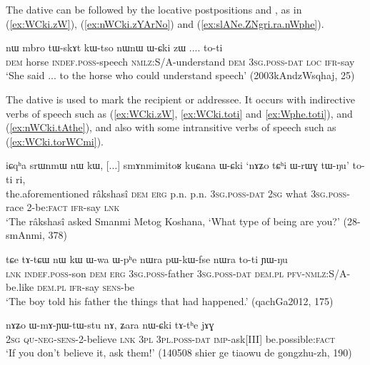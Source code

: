 The dative can be followed by the locative postpositions  and , as in (\ref{ex:WCki.zW}), (\ref{ex:nWCki.zYArNo}) and (\ref{ex:slANe.ZNgri.ra.nWphe}).


\begin{exe}
\ex \label{ex:WCki.zW}
\gll nɯ mbro tɯ-skɤt kɯ-tso nɯnɯ ɯ-ɕki zɯ .... to-ti \\
\textsc{dem} horse \textsc{indef}.\textsc{poss}-speech \textsc{nmlz}:S/A-understand \textsc{dem} \textsc{3sg}.\textsc{poss}-\textsc{dat} \textsc{loc} { } \textsc{ifr}-say \\
\glt `She said ... to the horse who could understand speech' (2003kAndzWsqhaj, 25)
\end{exe}

The dative is used to mark the recipient or addressee. It occurs with indirective verbs of speech such as  (\ref{ex:WCki.zW}, \ref{ex:WCki.toti} and \ref{ex:Wphe.toti}),  and  (\ref{ex:nWCki.tAthe}), and also with some intransitive verbs of speech such as  (\ref{ex:WCki.torWCmi}).

\begin{exe}
\ex \label{ex:WCki.toti}
\gll iɕqʰa srɯnmɯ nɯ kɯ, [...] smɤnmimitoʁ kuɕana ɯ-ɕki `nɤʑo tɕʰi ɯ-rɯɣ tɯ-ŋu' to-ti ri, \\
the.aforementioned râkshasî \textsc{dem} \textsc{erg} { } p.n. p.n. \textsc{3sg}.\textsc{poss}-\textsc{dat} \textsc{2sg} what \textsc{3sg}.\textsc{poss}-race 2-be:\textsc{fact} \textsc{ifr}-say \textsc{lnk} \\
\glt `The râkshasî asked Smanmi Metog Koshana, `What type of being are you?' (28-smAnmi, 378)
\end{exe}

\begin{exe}
\ex \label{ex:Wphe.toti}
\gll tɕe tɤ-tɕɯ nɯ kɯ ɯ-wa ɯ-pʰe nɯra pɯ-kɯ-fse nɯra to-ti ɲɯ-ŋu \\
\textsc{lnk} \textsc{indef}.\textsc{poss}-son \textsc{dem} \textsc{erg} \textsc{3sg}.\textsc{poss}-father \textsc{3sg}.\textsc{poss}-\textsc{dat} \textsc{dem}.\textsc{pl} \textsc{pfv}-\textsc{nmlz}:S/A-be.like \textsc{dem}.\textsc{pl}  \textsc{ifr}-say \textsc{sens}-be \\
\glt `The boy told his father the things that had happened.' (qachGa2012, 175)
\end{exe}

\begin{exe}
\ex \label{ex:nWCki.tAthe}
\gll nɤʑo ɯ-mɤ-ɲɯ-tɯ-stu nɤ, ʑara nɯ-ɕki tɤ-tʰe jɤɣ \\
\textsc{2sg} \textsc{qu}-\textsc{neg}-\textsc{sens}-2-believe \textsc{lnk} \textsc{3pl} \textsc{3pl}.\textsc{poss}-\textsc{dat} \textsc{imp}-ask[III] be.possible:\textsc{fact} \\
\glt `If you don't believe it, ask them!' (140508 shier ge tiaowu de gongzhu-zh, 190)
\end{exe}

